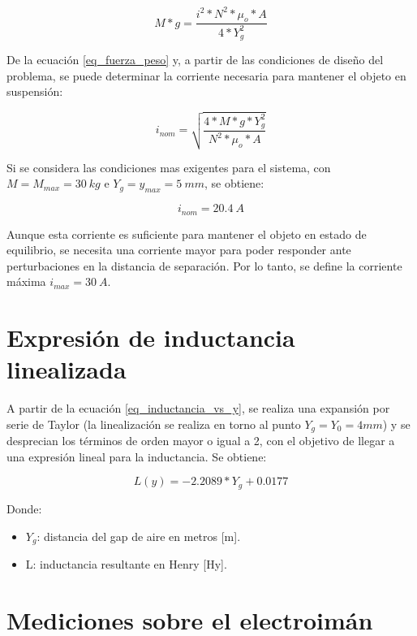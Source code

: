 \begin{equation}\label{eq_fuerza_peso}
	M*g=\frac{i^{2}*N^{2}*\mu_{o}*A}{4*Y_{g}^{2}}
\end{equation}

\noindent De la ecuación \ref{eq_fuerza_peso} y, a partir de las condiciones de diseño del problema, se puede determinar la corriente necesaria para mantener el objeto en suspensión:

\begin{equation} \label{eq_corriente_peso}
	i_{nom}=\sqrt{\frac{4*M*g*Y_{g}^{2}}{N^{2}*\mu_{o}*A}}
\end{equation}

Si se considera las condiciones mas exigentes para el sistema, con $M=M_{max}=30\:kg$ e $Y_{g}=y_{max}=5\:mm$, se obtiene:

\begin{equation}
	i_{nom}=20.4\:A
\end{equation}

\noindent Aunque esta corriente es suficiente para mantener el objeto en estado de equilibrio, se necesita una corriente mayor para poder responder ante perturbaciones en la distancia de separación. Por lo tanto, se define la corriente máxima $i_{max}=30\:A$.



\section{Expresión de inductancia linealizada}
\label{secc_exp_ind_linealizada}

\noindent A partir de la ecuación \ref{eq_inductancia_vs_y}, se realiza una expansión por serie de Taylor (la linealización se realiza en torno al punto $Y_{g}=Y_{0}=4mm$) y se desprecian los términos de orden mayor o igual a 2, con el objetivo de llegar a una expresión lineal para la inductancia. Se obtiene:


\begin{equation} \label{eq_inductancia_lineal_teorica}
	L(y)=-2.2089*Y_{g}+0.0177
\end{equation}

\noindent Donde:
\begin{itemize}
	\item $Y_{g}$: distancia del gap de aire en metros [m].
	\item L: inductancia resultante en Henry [Hy].
\end{itemize}

\section{Mediciones sobre el electroimán}

